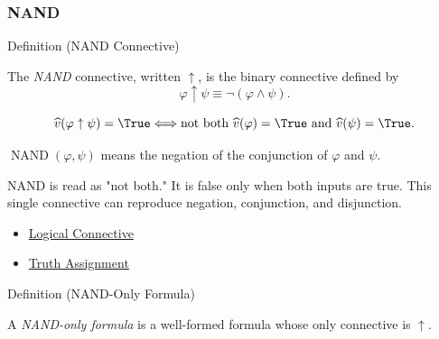 \subsubsection*{NAND}

\begin{definitionbox}{Definition (NAND Connective)}
\begin{definition}
\label{def:nand-connective-propositional-logic}
The \emph{NAND} connective, written \(\uparrow\), is the binary connective
defined by
\[
\varphi\uparrow\psi\equiv\neg(\varphi\land\psi).
\]
\end{definition}
\end{definitionbox}

\begin{remark*}
\[
\widehat v(\varphi\uparrow\psi)=\True
\Longleftrightarrow
\text{not both }\widehat v(\varphi)=\True\text{ and }\widehat v(\psi)=\True.
\]
\end{remark*}

\begin{remark*}
\(\operatorname{NAND}(\varphi,\psi)\) means the negation of the conjunction of
\(\varphi\) and \(\psi\).
\end{remark*}

\begin{remark*}[Interpretation]
NAND is read as "not both." It is false only when both inputs are true. This
single connective can reproduce negation, conjunction, and disjunction.
\end{remark*}

\begin{dependencies}
\begin{itemize}
  \item \hyperref[def:logical-connective]{Logical Connective}
  \item \hyperref[def:truth-assignment-propositional-logic]{Truth Assignment}
\end{itemize}
\end{dependencies}

\begin{definitionbox}{Definition (NAND-Only Formula)}
\begin{definition}
\label{def:nand-only-formula-propositional-logic}
A \emph{NAND-only formula} is a well-formed formula whose only connective is
\(\uparrow\).
\end{definition}
\end{definitionbox}

